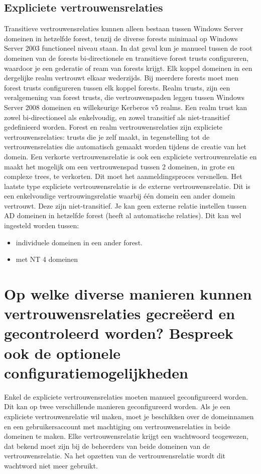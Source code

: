 \subsection{Expliciete vertrouwensrelaties}

Transitieve vertrouwensrelaties kunnen alleen bestaan tussen Windows Server
domeinen in hetzelfde forest, tenzij de diverse forests minimaal op Windows
Server 2003 functioneel niveau staan. In dat geval kun je manueel tussen de root
domeinen van de forests bi-directionele en transitieve forest trusts
configureren, waardoor je een gederatie of ream van forests krijgt. Elk koppel
domeinen in een dergelijke realm vertrouwt elkaar wederzijds. Bij meerdere
forests moet men forest trusts configureren tussen elk koppel forests.
Realm trusts, zijn een veralgemening van forest trusts, die vertrouwenspaden
leggen tussen Windows Server 2008 domeinen en willekeurige Kerberos v5 realms.
Een realm trust kan zowel bi-directioneel als enkelvoudig, en zowel transitief
als niet-transitief gedefinieerd worden.
Forest en realm vertrouwensrelaties zijn expliciete vertrouwensrelaties: trusts
die je zelf maakt, in tegenstelling tot de vertrouwensrelaties die automatisch
gemaakt worden tijdens de creatie van het domein.
Een verkorte vertrouwensrelatie is ook een expliciete vertrouwenrelatie en
maakt het mogelijk om een vertrouwenspad tussen 2 domeinen, in grote en complexe
trees, te verkorten. Dit moet het aanmeldingsproces versnellen.
Het laatste type expliciete vertrouwensrelatie is de externe vertrouwensrelatie.
Dit is een enkelvoudige vertrouwingsrelatie waarbij één domein een ander domein
vertrouwt. Deze zijn niet-transitief. Je kan geen externe relatie instellen
tussen AD domeinen in hetzelfde forest (heeft al automatische relaties). Dit kan
wel ingesteld worden tussen:
\begin{itemize}
	\item individuele domeinen in een ander forest.
	\item met NT 4 domeinen
\end{itemize}

\section{Op welke diverse manieren kunnen vertrouwensrelaties gecreëerd en
gecontroleerd worden? Bespreek ook de optionele configuratiemogelijkheden}

Enkel de expliciete vertrouwensrelaties moeten manueel geconfigureerd worden.
Dit kan op twee verschillende manieren geconfigureerd worden. Als je een
expliciete vertrouwenrelatie wil maken, moet je beschikken over de domeinnamen
en een gebruikersaccount met machtiging om vertrouwensrelaties in beide domeinen
te maken. Elke vertrouwensrelatie krijgt een wachtwoord teogewezen, dat bekend
moet zijn bij de beheerders van beide domeinen van de vertrouwensrelatie. Na het
opzetten van de vertrouwensrelatie wordt dit wachtword niet meer gebruikt.

